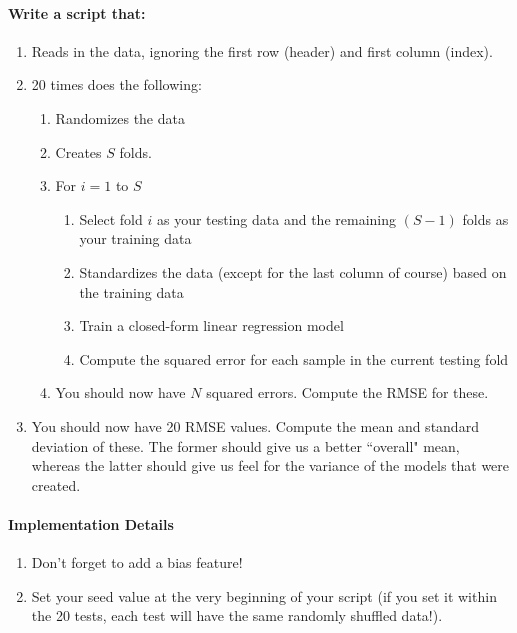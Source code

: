 \documentclass[12pt]{article}
\begin{document}
\paragraph{Write a script that:}
\begin{enumerate}
	\item Reads in the data, ignoring the first row (header) and first column (index).
	\item 20 times does the following:
	\begin{enumerate}
		\item Randomizes the data
		\item Creates $S$ folds.
  		\item For $i=1$ to $S$
	  	\begin{enumerate}
  			\item Select fold $i$ as your testing data and the remaining $(S-1)$ folds as your training data
			\item Standardizes the data (except for the last column of course) based on the training data
			\item Train a closed-form linear regression model
		  	\item Compute the squared error for each sample in the current testing fold
		\end{enumerate}
		\item You should now have $N$ squared errors.  Compute the RMSE for these.  
	\end{enumerate}
	\item You should now have 20 RMSE values.  Compute the mean and standard deviation of these.  The former should give us a better ``overall" mean, whereas the latter should give us feel for the variance of the models that were created.
\end{enumerate}


\paragraph{Implementation Details}
\begin{enumerate}
\item Don't forget to add a bias feature!
\item Set your seed value at the very beginning of your script (if you set it within the 20 tests, each test will have the same randomly shuffled data!).
\end{enumerate}
\end{document}
